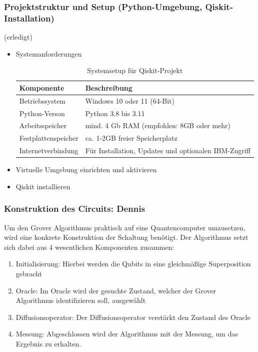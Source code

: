 \subsubsection{Projektstruktur und Setup (Python-Umgebung, Qiskit-Installation)} (erledigt)
\begin{itemize}
        \item Systemanforderungen
        \begin{table}[h]
        \centering
        \begin{tabular}{|l|l|}
        \hline
        \textbf{Komponente} & \textbf{Beschreibung} \\
        \hline
            Betriebssystem& Windows 10 oder 11 (64-Bit)\\\hline
            Python-Verson& Python 3.8 bis 3.11\\\hline
            Arbeitsspeicher& mind. 4 Gb RAM (empfohlen: 8GB oder mehr)\\
        \hline
 Festplattenspeicher &ca. 1-2GB freier Speicherplatz\\\hline
 Internetverbindung&Für Installation, Updates und optionalen IBM-Zugriff\\ \hline
        \end{tabular}
        \caption{Systemsetup für Qiskit-Projekt}
        \label{tab:setup}
\end{table}
        \item Virtuelle Umgebung einrichten und aktivieren
        \item Qiskit installieren
    \end{itemize}
\subsubsection{Konstruktion des Circuits: Dennis}


Um den Grover Algorithmus praktisch auf eine Quantencomputer umzusetzen, wird eine konkrete Konstruktion der Schaltung benötigt. Der Algorithmus setzt sich dabei aus 4 wesentlichen Komponenten zusammen: 
\begin{enumerate}
    \item  Initialisierung: Hierbei werden die Qubits in eine gleichmäßige Superposition gebracht
    \item Oracle: Im Oracle wird der gesuchte Zustand, welcher der Grover Algorithmus identifizieren soll, ausgewählt
    \item Diffusionsoperator: Der Diffusionsoperator verstärkt den Zustand des Oracle
    \item   Messung: Abgeschlossen wird der Algorithmus mit der Messung, um das Ergebnis zu erhalten. 
\end{enumerate}

